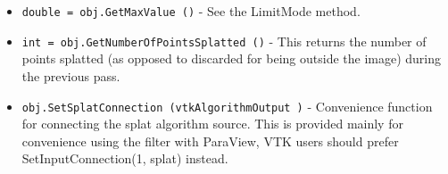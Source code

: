 \begin{itemize}
\item  \verb|double = obj.GetMaxValue ()| -  See the LimitMode method.

\item  \verb|int = obj.GetNumberOfPointsSplatted ()| -  This returns the number of points splatted (as opposed to
 discarded for being outside the image) during the previous pass.

\item  \verb|obj.SetSplatConnection (vtkAlgorithmOutput )| -  Convenience function for connecting the splat algorithm source.
 This is provided mainly for convenience using the filter with
 ParaView, VTK users should prefer SetInputConnection(1, splat) instead.

\end{itemize}

